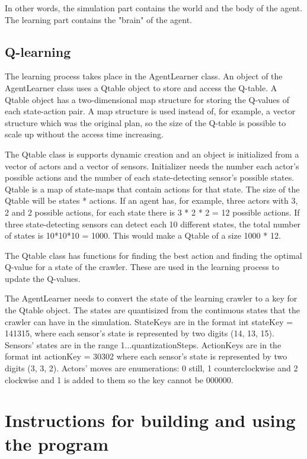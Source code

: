 \documentclass{article}
\begin{document}
In other words, the simulation part contains the world and the body of the
agent. The learning part contains the "brain" of the agent.


\subsection{Q-learning}

The learning process takes place in the AgentLearner class.
An object of the AgentLearner
class uses a Qtable object to store and access the Q-table. A Qtable object
has a two-dimensional map structure for storing the Q-values of each
state-action pair. A map structure is used instead of, for example,
a vector structure which was the original plan, so the size of
the Q-table is possible to scale up without the access time increasing.

The Qtable class is supports dynamic creation and an object is initialized
from a vector of actors and a vector of sensors. Initializer needs
the number each actor's possible actions and the number of each
state-detecting sensor's possible states. Qtable is a map of
state-maps that contain actions for that state. The size of the Qtable
will be states * actions. If an agent has, for example, three actors
with 3, 2 and 2 possible actions, for each state there is
3 * 2 * 2 = 12 possible actions. If three state-detecting sensors can
detect each 10 different states, the total number of states is
10*10*10 = 1000. This would make a Qtable of a size 1000 * 12.

The Qtable class has functions for finding the best action and finding
the optimal Q-value for a state of the crawler. These are used in the
learning process to update the Q-values.

The AgentLearner needs to convert the state of the learning crawler to a key
for the Qtable object. The states are quantisized from the continuous states
that the crawler can have in the simulation. StateKeys are in the format
int stateKey = 141315, where each sensor's
state is represented by two digits (14, 13, 15). Sensors' states are
in the range 1...quantizationSteps. ActionKeys are in the format
int actionKey = 30302 where each sensor's
state is represented by two digits (3, 3, 2). Actors' moves are
enumerations: 0 still, 1 counterclockwise and 2 clockwise and 1 is added to them
so the key cannot be 000000.


\section{Instructions for building and using the program}
\end{document}

